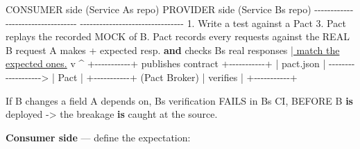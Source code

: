 \documentclass[11pt]{article}
\newenvironment{Shaded}{\begin{snugshade}}{\end{snugshade}}
\newcommand{\ErrorTok}[1]{\textcolor[rgb]{0.85,0.27,0.33}{\underline{#1}}}
\newcommand{\FloatTok}[1]{\textcolor[rgb]{0.96,0.45,0.00}{#1}}
\newcommand{\KeywordTok}[1]{\textcolor[rgb]{0.81,0.81,0.76}{\textbf{#1}}}
\newcommand{\NormalTok}[1]{\textcolor[rgb]{0.81,0.81,0.76}{#1}}
\newcommand{\OperatorTok}[1]{\textcolor[rgb]{0.81,0.81,0.76}{#1}}
\newcommand{\StringTok}[1]{\textcolor[rgb]{0.96,0.31,0.31}{#1}}
\begin{document}
\begin{Shaded}
\begin{Highlighting}[]
\NormalTok{  CONSUMER side (Service A}\StringTok{\textquotesingle{}s repo)        PROVIDER side (Service B\textquotesingle{}}\NormalTok{s repo)}
  \OperatorTok{{-}{-}{-}{-}{-}{-}{-}{-}{-}{-}{-}{-}{-}{-}{-}{-}{-}{-}{-}{-}{-}{-}{-}{-}{-}{-}{-}{-}{-}{-}{-}{-}{-}{-}}      \OperatorTok{{-}{-}{-}{-}{-}{-}{-}{-}{-}{-}{-}{-}{-}{-}{-}{-}{-}{-}{-}{-}{-}{-}{-}{-}{-}{-}{-}{-}{-}{-}{-}{-}}
  \FloatTok{1.}\NormalTok{ Write a test against a Pact          }\FloatTok{3.}\NormalTok{ Pact replays the recorded}
\NormalTok{     MOCK of B. Pact records every           requests against the REAL B}
\NormalTok{     request A makes }\OperatorTok{+}\NormalTok{ expected resp.        }\KeywordTok{and}\NormalTok{ checks }\StringTok{B\textquotesingle{}s real responses}
\ErrorTok{              |                                match the expected ones.}
\NormalTok{              v                                        }\OperatorTok{\^{}}
        \OperatorTok{+{-}{-}{-}{-}{-}{-}{-}{-}{-}{-}{-}+}\NormalTok{   publishes contract   }\OperatorTok{+{-}{-}{-}{-}{-}{-}{-}{-}{-}{-}{-}+}
        \OperatorTok{|}\NormalTok{  pact.json }\OperatorTok{|} \OperatorTok{{-}{-}{-}{-}{-}{-}{-}{-}{-}{-}{-}{-}{-}{-}{-}{-}{-}{-}{-}\textgreater{}}  \OperatorTok{|}\NormalTok{ Pact      }\OperatorTok{|}
        \OperatorTok{+{-}{-}{-}{-}{-}{-}{-}{-}{-}{-}{-}+}\NormalTok{    (Pact Broker)       }\OperatorTok{|}\NormalTok{ verifies  }\OperatorTok{|}
                                             \OperatorTok{+{-}{-}{-}{-}{-}{-}{-}{-}{-}{-}{-}+}

\NormalTok{  If B changes a field A depends on, }\StringTok{B\textquotesingle{}s verification FAILS in B\textquotesingle{}}\NormalTok{s CI,}
\NormalTok{  BEFORE B }\KeywordTok{is}\NormalTok{ deployed }\OperatorTok{{-}\textgreater{}}\NormalTok{ the breakage }\KeywordTok{is}\NormalTok{ caught at the source.}
\end{Highlighting}
\end{Shaded}

\textbf{Consumer side} --- define the expectation:

\end{document}

